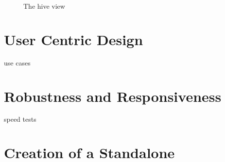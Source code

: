 \begin{figure}[ht]
\centering
\caption{The hive view}
\label{fig:hive}
\end{figure}

	
\section{User Centric Design}
	use cases

\section{Robustness and Responsiveness}
	speed tests

\section{Creation of a Standalone}